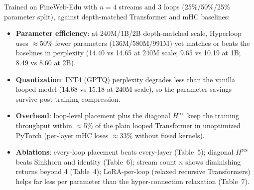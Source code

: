Trained on FineWeb-Edu with $n = 4$ streams and 3 loops (25\%/50\%/25\%
parameter split), against depth-matched Transformer and mHC baselines:
\begin{itemize}[leftmargin=*]
    \item \textbf{Parameter efficiency}: at 240M/1B/2B depth-matched scale,
        Hyperloop uses $\approx$50\% fewer parameters (136M/580M/991M) yet
        matches or beats the baselines in perplexity (14.40 vs 14.65 at
        240M scale; 9.65 vs 10.19 at 1B; 8.49 vs 8.60 at 2B).
    \item \textbf{Quantization}: INT4 (GPTQ) perplexity degrades less than
        the vanilla looped model (14.68 vs 15.18 at 240M scale), so the
        parameter savings survive post-training compression.
    \item \textbf{Overhead}: loop-level placement plus the diagonal
        $H^{\text{res}}$ keep the training throughput within $\approx$5\% of
        the plain looped Transformer in unoptimized PyTorch (per-layer mHC
        loses $\approx$33\% without fused kernels).
    \item \textbf{Ablations}: every-loop placement beats every-layer
        (Table~5); diagonal $H^{\text{res}}$ beats Sinkhorn and identity
        (Table~6); stream count $n$ shows diminishing returns beyond 4
        (Table~4); LoRA-per-loop (relaxed recursive Transformers) helps far
        less per parameter than the hyper-connection relaxation (Table~7).
\end{itemize}
